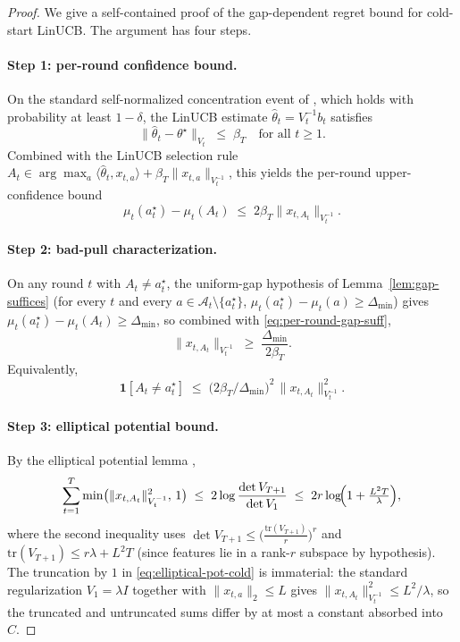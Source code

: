 \documentclass{article}
\theoremstyle{definition}
\theoremstyle{remark}
\theoremstyle{remark}
\begin{document}
\begin{proof}
We give a self-contained proof of the gap-dependent regret bound for
cold-start LinUCB. The argument has four steps.

\paragraph{Step 1: per-round confidence bound.}
On the standard self-normalized concentration event of
\cite{abbasi2011improved}, which holds with probability at least
$1-\delta$, the LinUCB estimate $\widehat\theta_t = V_t^{-1}b_t$ satisfies
\[
\bigl\|\widehat\theta_t-\theta^\star\bigr\|_{V_t} \;\le\; \beta_T
\quad\text{for all }t\ge 1.
\]
Combined with the LinUCB selection rule
$A_t \in \arg\max_a \langle\widehat\theta_t,x_{t,a}\rangle + \beta_T\|x_{t,a}\|_{V_t^{-1}}$,
this yields the per-round upper-confidence bound
\begin{equation}
\label{eq:per-round-gap-suff}
\mu_t(a_t^\star) - \mu_t(A_t) \;\le\; 2\beta_T \|x_{t,A_t}\|_{V_t^{-1}}.
\end{equation}

\paragraph{Step 2: bad-pull characterization.}
On any round $t$ with $A_t\ne a_t^\star$, the uniform-gap hypothesis of
Lemma~\ref{lem:gap-suffices} (for every $t$ and every
$a\in\mathcal A_t\setminus\{a_t^\star\}$,
$\mu_t(a_t^\star)-\mu_t(a)\ge\Delta_{\min}$) gives
$\mu_t(a_t^\star) - \mu_t(A_t) \ge \Delta_{\min}$, so combined with
\eqref{eq:per-round-gap-suff},
\[
\|x_{t,A_t}\|_{V_t^{-1}} \;\ge\; \frac{\Delta_{\min}}{2\beta_T}.
\]
Equivalently,
\begin{equation}
\label{eq:bad-pull-charact}
\mathbf 1[A_t\ne a_t^\star]
\;\le\;
\bigl(2\beta_T/\Delta_{\min}\bigr)^2\,\|x_{t,A_t}\|_{V_t^{-1}}^2.
\end{equation}

\paragraph{Step 3: elliptical potential bound.}
By the elliptical potential lemma \cite[Lemma 11]{abbasi2011improved},
\begin{equation}
\label{eq:elliptical-pot-cold}
\sum_{t=1}^T \min\bigl(\|x_{t,A_t}\|_{V_t^{-1}}^2,\,1\bigr)
\;\le\;
2\log\frac{\det V_{T+1}}{\det V_1}
\;\le\;
2r\log\!\Bigl(1+\tfrac{L^2 T}{\lambda}\Bigr),
\end{equation}
where the second inequality uses
$\det V_{T+1}\le\bigl(\frac{\mathrm{tr}(V_{T+1})}{r}\bigr)^r$ and
$\mathrm{tr}(V_{T+1})\le r\lambda + L^2 T$ (since features lie in a
rank-$r$ subspace by hypothesis). The truncation by $1$ in
\eqref{eq:elliptical-pot-cold} is immaterial: the standard regularization
$V_1=\lambda I$ together with $\|x_{t,a}\|_2\le L$ gives
$\|x_{t,A_t}\|_{V_t^{-1}}^2 \le L^2/\lambda$, so the truncated and
untruncated sums differ by at most a constant absorbed into~$C$.


\end{proof}
\end{document}
